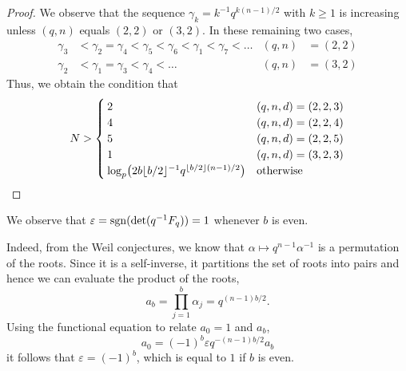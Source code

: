 \begin{proof}
We observe that the sequence $\gamma_k = k^{-1} q^{k (n - 1) / 2}$ 
with $k \geq 1$ is increasing unless $(q,n)$ equals $(2,2)$ or $(3,2)$.  
In these remaining two cases, 
\begin{align*}
\gamma_3 & < \gamma_2 = \gamma_4 < \gamma_5 < \gamma_6 < \gamma_1 < \gamma_7 < \dotsc & (q,n) & = (2,2) \\
\gamma_2 & < \gamma_1 = \gamma_3 < \gamma_4 < \dotsc & (q,n) & = (3,2)
\end{align*}
Thus, we obtain the condition that 
\begin{equation*}
N > \begin{cases}
    2 & (q,n,d) = (2,2,3) \\
    4 & (q,n,d) = (2,2,4) \\
    5 & (q,n,d) = (2,2,5) \\
    1 & (q,n,d) = (3,2,3) \\
    \log_p \bigl( 2 b \lfloor b/2\rfloor^{-1} q^{\left\lfloor b/2\right\rfloor (n - 1) / 2} \bigr) & \text{otherwise}
    \end{cases}
\end{equation*}
\end{proof}

\begin{rem}
We observe that $\varepsilon = \operatorname{sgn}(\det(q^{-1} F_q)) = 1$ whenever $b$ is even.

Indeed, from the Weil conjectures, we know that $\alpha \mapsto q^{n-1} \alpha^{-1}$ 
is a permutation of the roots.  Since it is a self-inverse, it partitions the 
set of roots into pairs and hence we can evaluate the product of the roots,
\begin{equation*}
a_b = \prod_{j=1}^{b} \alpha_j = q^{(n-1)b/2}.
\end{equation*}
Using the functional equation to relate $a_0 = 1$ and $a_b$, 
\begin{equation*}
a_{0} = (-1)^{b} \varepsilon q^{-(n-1) b / 2} a_{b}
\end{equation*}
it follows that $\varepsilon = (-1)^b$, which is equal to $1$ if $b$ is even.
\end{rem}

